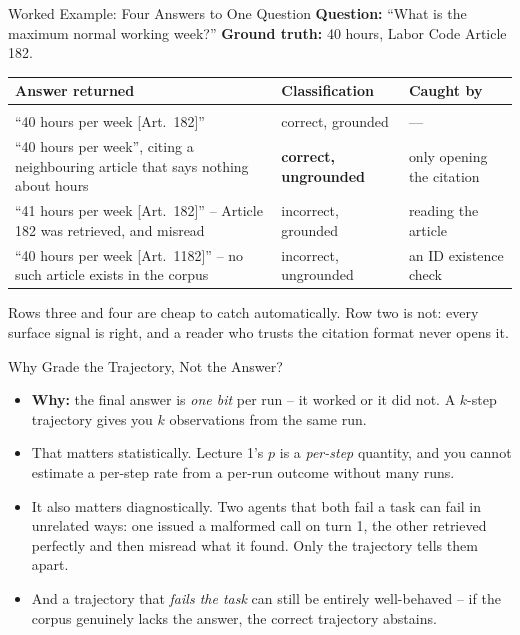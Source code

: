 \begin{frame}{Worked Example: Four Answers to One Question}
\footnotesize
\textbf{Question:} ``What is the maximum normal working week?'' \quad
\textbf{Ground truth:} 40 hours, Labor Code Article 182.
\smallskip

\scriptsize
\begin{tabular}{@{}p{}p{}p{}@{}}
\textbf{Answer returned} & \textbf{Classification} & \textbf{Caught by} \\[3pt]
\hline\\[-6pt]
``40 hours per week [Art.~182]'' & correct, grounded & --- \\[4pt]
\pause
``40 hours per week'', citing a neighbouring article that says nothing about hours
  & \textcolor{RLBlue}{\textbf{correct, ungrounded}} & only opening the citation \\[4pt]
\pause
``41 hours per week [Art.~182]'' -- Article 182 was retrieved, and misread
  & incorrect, grounded & reading the article \\[4pt]
\pause
``40 hours per week [Art.~1182]'' -- no such article exists in the corpus
  & incorrect, ungrounded & an ID existence check \\
\end{tabular}
\pause

\smallskip
\footnotesize
Rows three and four are cheap to catch automatically. Row two is not: every surface signal is right, and a reader who trusts the citation format never opens it.
\end{frame}

\begin{frame}{Why Grade the Trajectory, Not the Answer?}
\begin{itemize}
  \item \textbf{Why:} the final answer is \emph{one bit} per run -- it worked or it did not. A $k$-step trajectory gives you $k$ observations from the same run.
  \pause
  \item That matters statistically. Lecture 1's $p$ is a \emph{per-step} quantity, and you cannot estimate a per-step rate from a per-run outcome without many runs.
  \pause
  \item It also matters diagnostically. Two agents that both fail a task can fail in unrelated ways: one issued a malformed call on turn 1, the other retrieved perfectly and then misread what it found. Only the trajectory tells them apart.
  \pause
  \item And a trajectory that \emph{fails the task} can still be entirely well-behaved -- if the corpus genuinely lacks the answer, the correct trajectory abstains.
\end{itemize}
\end{frame}

